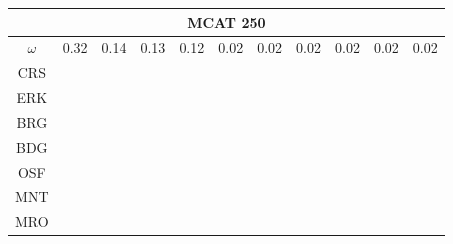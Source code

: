 \documentclass[12pt]{article}
\begin{document}
\begin{figure}[!h]
\centering
\begin{tabular}{|c|c|c|c|c|c|c|c|c|c|c|}
        \hline \multicolumn{11}{|c|}{MCAT 250} \\ \hline 
        $\omega$&0.32&0.14&0.13&0.12&0.02&0.02&0.02&0.02&0.02&0.02 \\ \hline
        CRS&\cellcolor[HTML]{E41A1C}&\cellcolor[HTML]{E41A1C}&\cellcolor[HTML]{E41A1C}&\cellcolor[HTML]{E41A1C}&\cellcolor[HTML]{E41A1C}&\cellcolor[HTML]{E41A1C}&\cellcolor[HTML]{E41A1C}&\cellcolor[HTML]{E41A1C}&\cellcolor[HTML]{E41A1C}&\cellcolor[HTML]{E41A1C} \\ \hline%
        ERK&\cellcolor[HTML]{377EB8}&\cellcolor[HTML]{377EB8}&\cellcolor[HTML]{377EB8}&\cellcolor[HTML]{377EB8}&\cellcolor[HTML]{377EB8}&\cellcolor[HTML]{377EB8}&\cellcolor[HTML]{377EB8}&\cellcolor[HTML]{377EB8}&\cellcolor[HTML]{377EB8}&\cellcolor[HTML]{377EB8} \\ \hline%
        BRG&\cellcolor[HTML]{4DAF4A}&\cellcolor[HTML]{4DAF4A}&\cellcolor[HTML]{4DAF4A}&\cellcolor[HTML]{4DAF4A}&\cellcolor[HTML]{4DAF4A}&\cellcolor[HTML]{4DAF4A}&\cellcolor[HTML]{4DAF4A}&\cellcolor[HTML]{4DAF4A}&\cellcolor[HTML]{4DAF4A}&\cellcolor[HTML]{4DAF4A} \\ \hline%
        BDG&\cellcolor[HTML]{4DAF4A}&\cellcolor[HTML]{4DAF4A}&\cellcolor[HTML]{4DAF4A}&\cellcolor[HTML]{4DAF4A}&\cellcolor[HTML]{4DAF4A}&\cellcolor[HTML]{4DAF4A}&\cellcolor[HTML]{4DAF4A}&\cellcolor[HTML]{984EA3}&\cellcolor[HTML]{4DAF4A}&\cellcolor[HTML]{4DAF4A} \\ \hline%
        OSF&\cellcolor[HTML]{984EA3}&\cellcolor[HTML]{984EA3}&\cellcolor[HTML]{984EA3}&\cellcolor[HTML]{984EA3}&\cellcolor[HTML]{4DAF4A}&\cellcolor[HTML]{4DAF4A}&\cellcolor[HTML]{4DAF4A}&\cellcolor[HTML]{984EA3}&\cellcolor[HTML]{4DAF4A}&\cellcolor[HTML]{4DAF4A} \\ \hline%
        MNT&\cellcolor[HTML]{984EA3}&\cellcolor[HTML]{984EA3}&\cellcolor[HTML]{984EA3}&\cellcolor[HTML]{984EA3}&\cellcolor[HTML]{984EA3}&\cellcolor[HTML]{984EA3}&\cellcolor[HTML]{984EA3}&\cellcolor[HTML]{FF7F00}&\cellcolor[HTML]{984EA3}&\cellcolor[HTML]{984EA3} \\ \hline%
        MRO&\cellcolor[HTML]{984EA3}&\cellcolor[HTML]{984EA3}&\cellcolor[HTML]{984EA3}&\cellcolor[HTML]{984EA3}&\cellcolor[HTML]{984EA3}&\cellcolor[HTML]{984EA3}&\cellcolor[HTML]{984EA3}&\cellcolor[HTML]{FF7F00}&\cellcolor[HTML]{984EA3}&\cellcolor[HTML]{984EA3} \\ \hline%

\end{tabular}
\end{figure}
\end{document}
